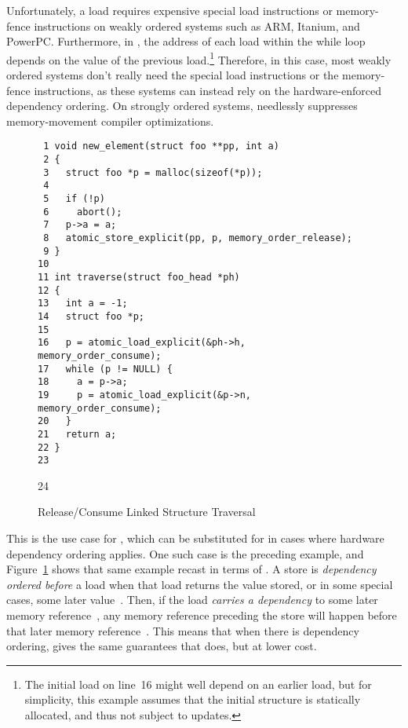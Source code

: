 \documentclass[letterpaper,twocolumn,10pt]{article}
\begin{document}
Unfortunately, a  load requires expensive
special load instructions or memory-fence instructions on weakly
ordered systems such as ARM, Itanium, and PowerPC.
Furthermore, in , the address of each
 load within the while loop depends on the value
of the previous  load.\footnote{
	The initial load on line~16 might well depend on an earlier
	load, but for simplicity, this example assumes that the
	initial  structure is statically allocated,
	and thus not subject to updates.}
Therefore, in this case, most weakly ordered systems don't really need
the special load instructions or the memory-fence instructions,
as these systems can instead rely on the hardware-enforced dependency
ordering.
On strongly ordered systems,  needlessly
suppresses memory-movement compiler optimizations.

\begin{figure}[tbp]
{ \scriptsize
\begin{verbatim}
 1 void new_element(struct foo **pp, int a)
 2 {
 3   struct foo *p = malloc(sizeof(*p));
 4 
 5   if (!p)
 6     abort();
 7   p->a = a;
 8   atomic_store_explicit(pp, p, memory_order_release);
 9 }
10 
11 int traverse(struct foo_head *ph)
12 {
13   int a = -1;
14   struct foo *p;
15 
16   p = atomic_load_explicit(&ph->h, memory_order_consume);
17   while (p != NULL) {
18     a = p->a;
19     p = atomic_load_explicit(&p->n, memory_order_consume);
20   }
21   return a;
22 }
23 \end{verbatim}
24 }
\caption{Release/Consume Linked Structure Traversal}
\label{fig:Release/Consume Linked Structure Traversal}
\end{figure}

This is the use case for , which can
be substituted for  in cases where
hardware dependency ordering applies.
One such case is the preceding example, and
Figure~\ref{fig:Release/Consume Linked Structure Traversal}
shows that same example recast in terms of .
A  store is \emph{dependency ordered before}
a  load when that load returns the value
stored, or in some special cases, some later
value~\cite[1.10p12]{RichardSmith2015N4527}.
Then, if the load \emph{carries a dependency} to some later
memory reference~\cite[1.10p11]{RichardSmith2015N4527},
any memory reference preceding the 
store will happen before that later memory
reference~\cite[1.10p11-1.10p14]{RichardSmith2015N4527}.
This means that when there is dependency ordering,
 gives the same guarantees that
 does, but at lower cost.
\end{document}
